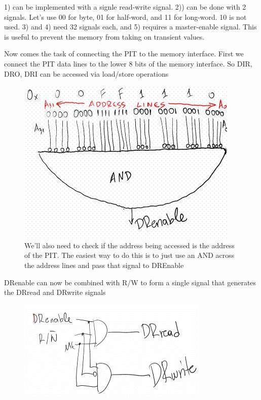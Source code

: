 \documentclass[../notes.tex]{subfiles}
\begin{document}
1) can be implemented with a signle read-write signal. 2)) can be done with 2 signals. Let's use 00 for byte, 01 for half-word, and 11 for long-word. 10 is not used.
3) and 4) need 32 signals each, and 5) requires a master-enable signal. This is useful to prevent the memory from taking on transient values.


Now comes the task of connecting the PIT to the memory interface.
First we connect the PIT data lines to the lower 8 bits of the memory interface. So DIR, DRO, DRI can be accessed via load/store operations


\begin{figure}[H]
	\centering
	\includegraphics[width=0.8\linewidth]{img/image_2022-10-16-00-55-19.png}
	\caption{We'll also need to check if the address being accessed is the address of the PIT. The easiest way to do this is to just use an AND across the address lines and pass that signal to DREnable}
\end{figure}


DRenable can now be combined with R/W to form a single signal that generates the DRread and DRwrite signals


\begin{figure}[H]
	\centering
	\includegraphics[width=0.8\linewidth]{img/image_2022-10-16-00-57-58.png}
\end{figure}
\end{document}
